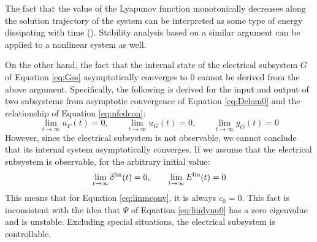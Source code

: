 \documentclass[tombow,dvipdfmx]{corona-a5-1.1}
\begin{document}
\begin{COLUMN}
The fact that the value of the Lyapunov function monotonically decreases along the solution trajectory of the system can be interpreted as some type of energy dissipating with time ().
Stability analysis based on a similar argument can be applied to a nonlinear system as well.

\end{COLUMN}

On the other hand, the fact that the internal state of the electrical subsystem $G$ of Equation \ref{eq:Gss} asymptotically converges to 0 cannot be derived from the above argument.
Specifically, the following is derived for the input and output of two subsystems from asymptotic convergence of Equation \ref{eq:Delom0} and the relationship of Equation \ref{eq:nfedcon}:
\[
\lim_{t\rightarrow \infty} u_F(t)  =0,\qquad
\lim_{t\rightarrow \infty} u_G(t)  =0,\qquad
\lim_{t\rightarrow \infty} y_G(t)  =0
\]
However, since the electrical subsystem is not observable, we cannot conclude that its internal system asymptotically converges.
If we assume that the electrical subsystem is observable, for the arbitrary initial value: 
\[
\lim_{t\rightarrow \infty}  \delta^{\rm lin}(t)  =0,\qquad
\lim_{t\rightarrow \infty}  E^{\rm lin}(t)  =0
\]
This means that for Equation \ref{eq:linmconv}, it is always $c_0=0$.
This fact is inconsistent with the idea that $\Psi$ of Equation \ref{eq:lindynu0} has a zero eigenvalue and is unstable.
Excluding special situations, the electrical subsystem is controllable.
\end{document}
